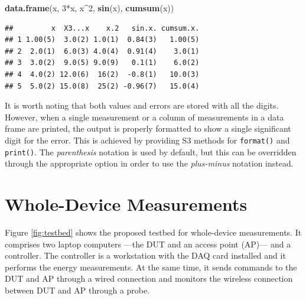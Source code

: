 \documentclass[twoside,nohyper]{tufte-book}
\newenvironment{Shaded}{}{}
\newcommand{\DecValTok}[1]{\textcolor[rgb]{0.25,0.63,0.44}{#1}}
\newcommand{\KeywordTok}[1]{\textcolor[rgb]{0.00,0.44,0.13}{\textbf{#1}}}
\newcommand{\NormalTok}[1]{#1}
\newcommand{\OperatorTok}[1]{\textcolor[rgb]{0.40,0.40,0.40}{#1}}
\begin{document}
\begin{Shaded}
\begin{Highlighting}[]
\KeywordTok{data.frame}\NormalTok{(x, }\DecValTok{3}\OperatorTok{*}\NormalTok{x, x}\OperatorTok{^}\DecValTok{2}\NormalTok{, }\KeywordTok{sin}\NormalTok{(x), }\KeywordTok{cumsum}\NormalTok{(x))}
\end{Highlighting}
\end{Shaded}

\begin{verbatim}
##         x  X3...x    x.2   sin.x. cumsum.x.
## 1 1.00(5)  3.0(2) 1.0(1)  0.84(3)   1.00(5)
## 2  2.0(1)  6.0(3) 4.0(4)  0.91(4)    3.0(1)
## 3  3.0(2)  9.0(5) 9.0(9)   0.1(1)    6.0(2)
## 4  4.0(2) 12.0(6)  16(2)  -0.8(1)   10.0(3)
## 5  5.0(2) 15.0(8)  25(2) -0.96(7)   15.0(4)
\end{verbatim}

It is worth noting that both values and errors are stored with all the digits. However, when a single measurement or a column of measurements in a data frame are printed, the output is properly formatted to show a single significant digit for the error. This is achieved by providing S3 methods for \texttt{format()} and \texttt{print()}. The \emph{parenthesis} notation is used by default, but this can be overridden through the appropriate option in order to use the \emph{plus-minus} notation instead.

\hypertarget{whole-device-measurements}{%
\section{Whole-Device Measurements}\label{whole-device-measurements}}

Figure \ref{fig:testbed} shows the proposed testbed for whole-device measurements. It comprises two laptop computers ---the DUT and an access point (AP)--- and a controller. The controller is a workstation with the DAQ card installed and it performs the energy measurements. At the same time, it sends commands to the DUT and AP through a wired connection and monitors the wireless connection between DUT and AP through a probe.
\end{document}
